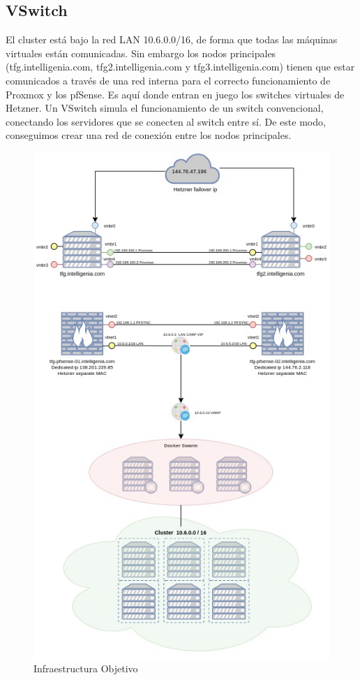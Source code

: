 	\subsection{VSwitch}
	\begin{text}
		El cluster está bajo la red LAN 10.6.0.0/16, de forma que todas las máquinas virtuales están comunicadas. Sin embargo los nodos principales (tfg.intelligenia.com, tfg2.intelligenia.com y tfg3.intelligenia.com) tienen que estar comunicados a través de una red interna para el correcto funcionamiento de Proxmox y los pfSense.
		Es aquí donde entran en juego los switches virtuales de Hetzner. Un VSwitch simula el funcionamiento de un switch convencional, conectando los servidores que se conecten al switch entre sí. De este modo, conseguimos crear una red de conexión entre los nodos principales.
	\end{text}

	\begin{figure}[!hbt]
		\label{InfraestructuraObjetivo}
		\centering
		\includegraphics[scale=0.75]{imagenes/Analisis/diagrama.jpg}
		\caption[Infraestructura Objetivo]{Infraestructura Objetivo}
	\end{figure}

